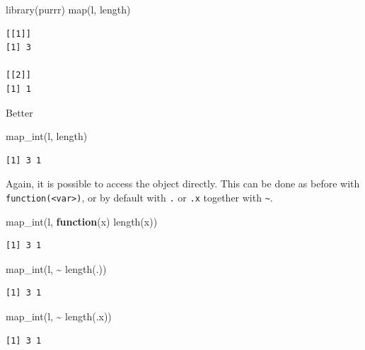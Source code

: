 \documentclass[ignorenonframetext,,t]{beamer}
\let\oldtextbf\textbf
\renewcommand{\textbf}[1]{\textcolor{spamwell}{\oldtextbf{#1}}}
\newenvironment{Shaded}{\begin{snugshade}}{\end{snugshade}}
\newcommand{\ControlFlowTok}[1]{\textcolor[rgb]{0.13,0.29,0.53}{\textbf{#1}}}
\newcommand{\FunctionTok}[1]{\textcolor[rgb]{0.00,0.00,0.00}{#1}}
\newcommand{\NormalTok}[1]{#1}
\newcommand{\SpecialCharTok}[1]{\textcolor[rgb]{0.00,0.00,0.00}{#1}}
\begin{document}
\begin{frame}[fragile]
\begin{Shaded}
\begin{Highlighting}[]
\FunctionTok{library}\NormalTok{(purrr)}
\FunctionTok{map}\NormalTok{(l, length)}
\end{Highlighting}
\end{Shaded}

\begin{verbatim}
[[1]]
[1] 3

[[2]]
[1] 1
\end{verbatim}

Better

\begin{Shaded}
\begin{Highlighting}[]
\FunctionTok{map\_int}\NormalTok{(l, length)}
\end{Highlighting}
\end{Shaded}

\begin{verbatim}
[1] 3 1
\end{verbatim}
\end{frame}

\begin{frame}[fragile]
Again, it is possible to access the object directly. This can be done as
before with \texttt{function(\textless{}var\textgreater{})}, or by
default with \texttt{.} or \texttt{.x} together with
\texttt{\textasciitilde{}}.

\begin{Shaded}
\begin{Highlighting}[]
\FunctionTok{map\_int}\NormalTok{(l, }\ControlFlowTok{function}\NormalTok{(x) }\FunctionTok{length}\NormalTok{(x))}
\end{Highlighting}
\end{Shaded}

\begin{verbatim}
[1] 3 1
\end{verbatim}

\begin{Shaded}
\begin{Highlighting}[]
\FunctionTok{map\_int}\NormalTok{(l, }\SpecialCharTok{\textasciitilde{}} \FunctionTok{length}\NormalTok{(.))}
\end{Highlighting}
\end{Shaded}

\begin{verbatim}
[1] 3 1
\end{verbatim}

\begin{Shaded}
\begin{Highlighting}[]
\FunctionTok{map\_int}\NormalTok{(l, }\SpecialCharTok{\textasciitilde{}} \FunctionTok{length}\NormalTok{(.x))}
\end{Highlighting}
\end{Shaded}

\begin{verbatim}
[1] 3 1
\end{verbatim}
\end{frame}
\end{document}
